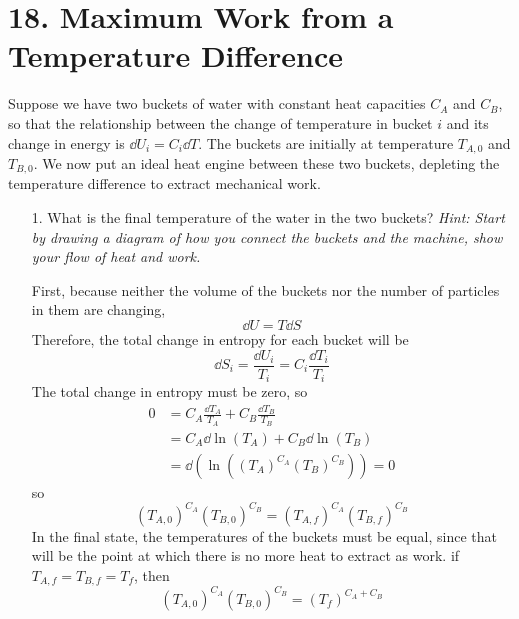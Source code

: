 \documentclass[a4paper,twoside]{article}
\begin{document}
\section*{18. Maximum Work from a Temperature Difference}
Suppose we have two buckets of water with constant heat capacities $ C_A $ and $ C_B $, so that the relationship between the change of temperature in bucket $ i $ and its change in energy is $ \dd{U_i} = C_i \dd{T} $. The buckets are initially at temperature $ T_{A,0} $ and $ T_{B,0} $. We now put an ideal heat engine between these two buckets, depleting the temperature difference to extract mechanical work.
\begin{itemize}
    \item[1.] What is the final temperature of the water in the two buckets? \textit{Hint: Start by drawing a diagram of how you connect the buckets and the machine, show your flow of heat and work.}
        \begin{problem}
            First, because neither the volume of the buckets nor the number of particles in them are changing,
            \begin{equation}
                \dd{U} = T \dd{S}
            \end{equation}
            Therefore, the total change in entropy for each bucket will be
            \begin{equation}
                \dd{S_i} = \frac{\dd{U_i}}{T_i} = C_i \frac{\dd{T_i}}{T_i}
            \end{equation}
            The total change in entropy must be zero, so
            \begin{align}
                0 &= C_A \frac{\dd{T_A}}{T_A} + C_B \frac{\dd{T_B}}{T_B} \\
                &= C_A \dd{\ln(T_A)} + C_B \dd{\ln(T_B)} \\
                &= \dd{(\ln( (T_A)^{C_A} (T_B)^{C_B}))} = 0
            \end{align}
            so
            \begin{equation}
                (T_{A,0})^{C_A} (T_{B,0})^{C_B} = (T_{A,f})^{C_A} (T_{B,f})^{C_B}
            \end{equation}
            In the final state, the temperatures of the buckets must be equal, since that will be the point at which there is no more heat to extract as work. if $ T_{A,f} = T_{B,f} = T_f $, then
            \begin{equation}
                (T_{A,0})^{C_A} (T_{B,0})^{C_B} = (T_f)^{C_A + C_B}
            \end{equation}

\end{problem}
\end{itemize}
\end{document}
